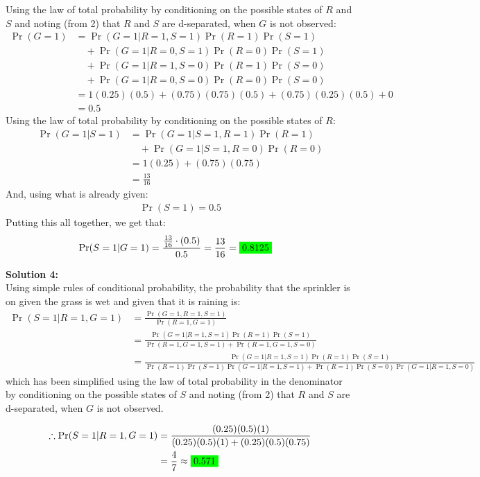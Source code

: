 \documentclass[submit]{harvardml}
\newcommand{\mathcolorbox}[2]{\colorbox{#1}{$\displaystyle #2$}}
\begin{document}
Using the law of total probability by conditioning on the possible states of $R$ and $S$ and noting (from 2) that $R$ and $S$ are d-separated, when $G$ is not observed:
\begin{align*}
    \Pr(G=1) &= \Pr(G=1|R=1,S=1)\Pr(R=1)\Pr(S=1)\\ &\quad+ \Pr(G=1|R=0,S=1)\Pr(R=0)\Pr(S=1)\\ &\quad+ \Pr(G=1|R=1,S=0)\Pr(R=1)\Pr(S=0)\\ &\quad+ \Pr(G=1|R=0,S=0)\Pr(R=0)\Pr(S=0)\\
    &= 1(0.25)(0.5) + (0.75)(0.75)(0.5) + (0.75)(0.25)(0.5) + 0\\
    &= 0.5
\end{align*}
Using the law of total probability by conditioning on the possible states of $R$:
\begin{align*}
    \Pr(G=1|S=1) &= \Pr(G=1|S=1,R=1)\Pr(R=1)\\ &\quad+ \Pr(G=1|S=1,R=0)\Pr(R=0)\\
    &= 1(0.25) + (0.75)(0.75)\\
    &= \frac{13}{16}
\end{align*}
And, using what is already given:
\begin{align*}
    \Pr(S=1) = 0.5
\end{align*}
Putting this all together, we get that:
\begin{align*}
     \Pr(S = 1 | G = 1) &= \frac{\frac{13}{16}\cdot(0.5)}{0.5} = \frac{13}{16} = \mathcolorbox{green}{0.8125}
\end{align*}

\textbf{Solution 4:}\\
Using simple rules of conditional probability, the probability that the sprinkler is on given the grass is wet and given that it is raining is:
\begin{align*}
     \Pr(S = 1 | R = 1, G = 1) &= \frac{\Pr(G = 1, R = 1, S = 1)}{\Pr(R=1,G=1)}\\
     &= \frac{\Pr(G = 1| R = 1, S = 1)\Pr(R=1)\Pr(S=1)}{\Pr(R=1,G=1,S=1) + \Pr(R=1,G=1, S=0)}\\
     &= \frac{\Pr(G = 1| R = 1, S = 1)\Pr(R=1)\Pr(S=1)}{\Pr(R=1)\Pr(S=1)\Pr(G=1|R=1,S=1) + \Pr(R=1)\Pr(S=0)\Pr(G=1|R=1,S=0)}
\end{align*}
which has been simplified using the law of total probability in the denominator by conditioning on the possible states of $S$ and noting (from 2) that $R$ and $S$ are d-separated, when $G$ is not observed.

\begin{align*}
     \therefore \Pr(S = 1 | R = 1, G = 1) &= \frac{(0.25)(0.5)(1)}{(0.25)(0.5)(1)+(0.25)(0.5)(0.75)}\\
     &= \frac{4}{7} \approx \mathcolorbox{green}{0.571}
\end{align*}
\end{document}
